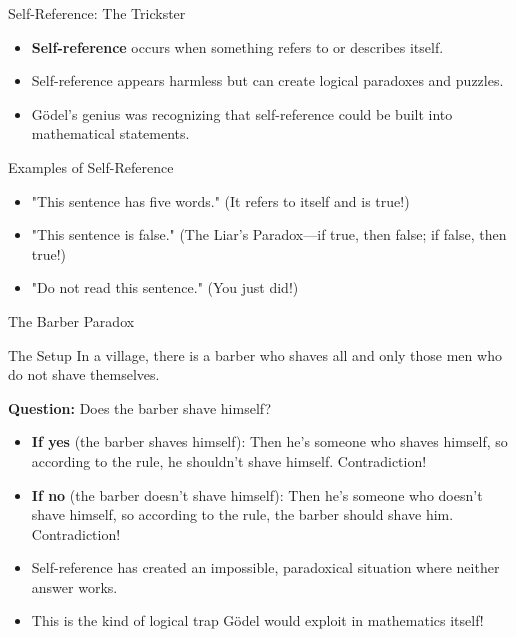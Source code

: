 \documentclass[aspectratio=169]{beamer}
\begin{document}
\begin{frame}{Self-Reference: The Trickster}

\begin{itemize}
    \item \textbf{Self-reference} occurs when something refers to or describes itself.
    \item Self-reference appears harmless but can create logical paradoxes and puzzles.
    \item Gödel's genius was recognizing that self-reference could be built into mathematical statements.
\end{itemize}

\begin{block}{Examples of Self-Reference}
\begin{itemize}
    \item "This sentence has five words." (It refers to itself and is true!)
    \item "This sentence is false." (The Liar's Paradox—if true, then false; if false, then true!)
    \item "Do not read this sentence." (You just did!)
\end{itemize}
\end{block}

\end{frame}

\begin{frame}{The Barber Paradox}

\begin{block}{The Setup}
In a village, there is a barber who shaves all and only those men who do not shave themselves.

\textbf{Question:} Does the barber shave himself?
\end{block}

\begin{itemize}
    \item \textbf{If yes} (the barber shaves himself): Then he's someone who shaves himself, so according to the rule, he shouldn't shave himself. Contradiction!
    \item \textbf{If no} (the barber doesn't shave himself): Then he's someone who doesn't shave himself, so according to the rule, the barber should shave him. Contradiction!
    \item Self-reference has created an impossible, paradoxical situation where neither answer works.
    \item This is the kind of logical trap Gödel would exploit in mathematics itself!
\end{itemize}

\end{frame}
\end{document}
